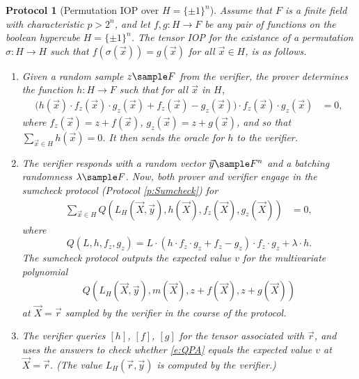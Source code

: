 \documentclass[11pt]{article}
\newtheorem{protocol}[]{Protocol}
\theoremstyle{definition}
\theoremstyle{remark}
\begin{document}
\begin{protocol}[Permutation IOP over $H=\{\pm 1\}^n$]
\label{prot:pa}
Assume that $F$ is a finite field with characteristic $p > 2^n$, and let $f,g :H\rightarrow F$ be any pair of functions on the boolean hypercube $H=\{\pm 1\}^n$.
The tensor IOP for the existance of a permutation $\sigma: H\longrightarrow H$ such that $f(\sigma(\vec x))=g(\vec x)$ for all $\vec x\in H$,
 is as follows.
\begin{enumerate} 
\item
\label{i:PAstep1}
Given a random sample $z \sample F$ from the verifier, the prover determines the function $h: H\rightarrow F$ such that for all $\vec x$ in $H$,
\begin{align} 
\label{e:pa:m}
\Big(h(\vec x)\cdot f_z(\vec x)\cdot g_z(\vec x)  + f_z(\vec x) - g_z(\vec x)\Big) \cdot   f_z(\vec x)\cdot g_z(\vec x) &= 0,
\end{align}
where $f_z(\vec x) = z + f(\vec x)$, $g_z(\vec x) = z + g(\vec x)$, and so that $\sum_{\vec x\in H} h(\vec x) = 0$.
It then sends the oracle for $h$ to the verifier.

\item
\label{i:PAstep2}
The verifier responds with a random vector $\vec y \sample F^n$ and a batching randomness $\lambda\sample F$.
Now, both prover and verifier engage in the sumcheck protocol (Protocol \ref{p:Sumcheck}) for 
\begin{align*} 
	\sum_{\vec x \in H} Q(L_H(\vec X, \vec y), h(\vec X),  f_z(\vec X),  g_z(\vec X))&= 0,
\end{align*}
where 
\begin{equation}
\label{e:Qsumcheck}
Q(L , h, f_z, g_z) =   
L \cdot  \left(h \cdot f_z \cdot g_z + f_z - g_z\right)\cdot  f_z \cdot g_z +  \lambda \cdot h.
\end{equation}
The sumcheck protocol outputs the expected value $v$ for the multivariate polynomial 
\begin{equation}
\label{e:QPA}
\begin{aligned}
Q(L_H(\vec X, \vec y), m(\vec X), z + f(\vec X),  z + g(\vec X))
\end{aligned}
\end{equation}
at $\vec X=\vec r$ sampled by the verifier in the course of the protocol.

\item
The verifier queries $[h]$, $[f]$, $[g]$ for the tensor associated with $\vec r$, and uses the answers 
to check whether \eqref{e:QPA} equals the expected value $v$ at $\vec X = \vec r$. 
(The value $L_H(\vec r, \vec y)$ is computed by the verifier.)
\end{enumerate}
\end{protocol}
\end{document}
